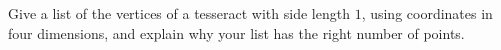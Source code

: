 Give a list of the vertices of a tesseract with side length $1$, using coordinates in four dimensions, and explain why your list has the right number of points.
